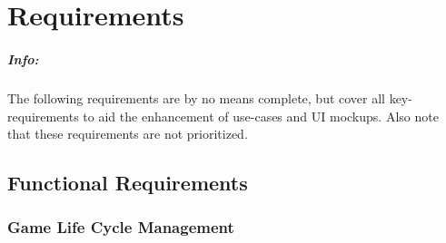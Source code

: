 \chapter{Requirements}


\paragraph{Info:}
The following requirements are by no means complete, but cover all key-requirements to aid the enhancement of use-cases and UI mockups. 
Also note that these requirements are not prioritized. 

\section {Functional Requirements}

\subsection {Game Life Cycle Management}

